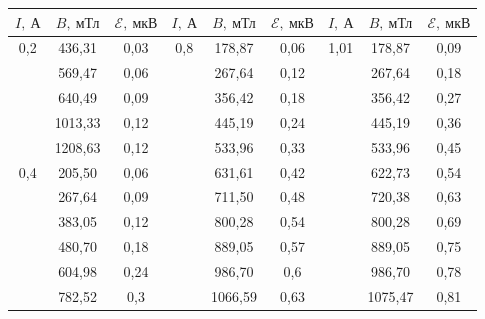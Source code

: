 \begin{table}[H]
\centering
\begin{tabular}{|c|c|c||c|c|c||c|c|c|}
\hline
$I, \ \text{А}$ & $B, \ \text{мТл}$
& $\mathscr{E}, \ \text{мкВ}$    & $I, \ \text{А}$
& $B, \ \text{мТл}$          & $\mathscr{E}, \ \text{мкВ}$    & $I, \ \text{А}$
& $B, \ \text{мТл}$          & $\mathscr{E}, \ \text{мкВ}$    \\ \hline
\multirow{5}{*}{0,2}   & 436,31  & 0,03 & \multirow{12}{*}{0,8} & 178,87  & 0,06 & \multirow{12}{*}{1,01} & 178,87  & 0,09 \\ \cline{2-3} \cline{5-6} \cline{8-9} 
                       & 569,47  & 0,06 &                       & 267,64  & 0,12 &                        & 267,64  & 0,18 \\ \cline{2-3} \cline{5-6} \cline{8-9} 
                       & 640,49  & 0,09 &                       & 356,42  & 0,18 &                        & 356,42  & 0,27 \\ \cline{2-3} \cline{5-6} \cline{8-9} 
                       & 1013,33 & 0,12 &                       & 445,19  & 0,24 &                        & 445,19  & 0,36 \\ \cline{2-3} \cline{5-6} \cline{8-9} 
                       & 1208,63 & 0,12 &                       & 533,96  & 0,33 &                        & 533,96  & 0,45 \\ \cline{1-3} \cline{5-6} \cline{8-9} 
\multirow{8}{*}{0,4}   & 205,50  & 0,06 &                       & 631,61  & 0,42 &                        & 622,73  & 0,54 \\ \cline{2-3} \cline{5-6} \cline{8-9} 
                       & 267,64  & 0,09 &                       & 711,50  & 0,48 &                        & 720,38  & 0,63 \\ \cline{2-3} \cline{5-6} \cline{8-9} 
                       & 383,05  & 0,12 &                       & 800,28  & 0,54 &                        & 800,28  & 0,69 \\ \cline{2-3} \cline{5-6} \cline{8-9} 
                       & 480,70  & 0,18 &                       & 889,05  & 0,57 &                        & 889,05  & 0,75 \\ \cline{2-3} \cline{5-6} \cline{8-9} 
                       & 604,98  & 0,24 &                       & 986,70  & 0,6  &                        & 986,70  & 0,78 \\ \cline{2-3} \cline{5-6} \cline{8-9} 
                       & 782,52  & 0,3  &                       & 1066,59 & 0,63 &                        & 1075,47 & 0,81 \\ \cline{2-3} \cline{5-6} \cline{8-9} 

\end{tabular}
\end{table}
